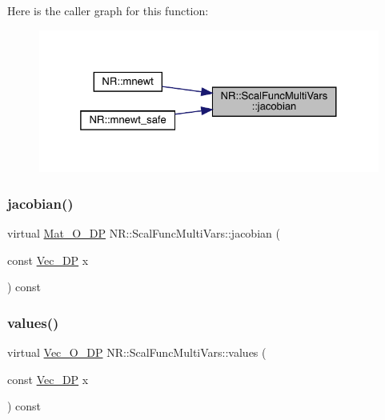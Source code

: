 Here is the caller graph for this function\+:\nopagebreak
\begin{figure}[H]
\begin{center}
\leavevmode
\includegraphics[width=325pt]{d5/d17/classNR_1_1ScalFuncMultiVars_ab8dd80ced0a7b26584bde4e34444c04a_icgraph}
\end{center}
\end{figure}
\mbox{\label{classNR_1_1ScalFuncMultiVars_ab8dd80ced0a7b26584bde4e34444c04a}} 
\subsubsection{\texorpdfstring{jacobian()}{jacobian()}\hspace{0.1cm}{\footnotesize\ttfamily [2/2]}}
{\footnotesize\ttfamily virtual \mbox{\hyperlink{namespaceNR_adc1f8da33094b6bbeb1f5f899515ce54}{Mat\+\_\+\+O\+\_\+\+DP}} N\+R\+::\+Scal\+Func\+Multi\+Vars\+::jacobian (\begin{DoxyParamCaption}\item[{const \mbox{\hyperlink{namespaceNR_a115a3196718c98e8e2562d80b06c23c5}{Vec\+\_\+\+DP}}}]{x }\end{DoxyParamCaption}) const\hspace{0.3cm}{\ttfamily [pure virtual]}}

\mbox{\label{classNR_1_1ScalFuncMultiVars_a5345ed027a649e71ae8ae3c8dadb436c}} 
\subsubsection{\texorpdfstring{values()}{values()}\hspace{0.1cm}{\footnotesize\ttfamily [1/2]}}
{\footnotesize\ttfamily virtual \mbox{\hyperlink{namespaceNR_a970094d23441f8ef6a45282a7eb2103d}{Vec\+\_\+\+O\+\_\+\+DP}} N\+R\+::\+Scal\+Func\+Multi\+Vars\+::values (\begin{DoxyParamCaption}\item[{const \mbox{\hyperlink{namespaceNR_a115a3196718c98e8e2562d80b06c23c5}{Vec\+\_\+\+DP}}}]{x }\end{DoxyParamCaption}) const\hspace{0.3cm}{\ttfamily [pure virtual]}}

